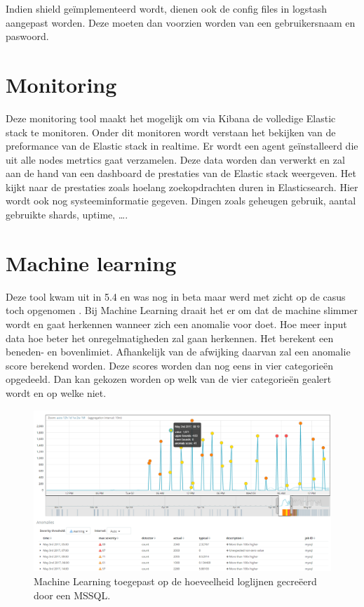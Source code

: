Indien shield geïmplementeerd wordt, dienen ook de config files in logstash aangepast worden. Deze moeten dan voorzien worden van een gebruikersnaam en paswoord.

\section{Monitoring}
\label{sec:monitoring}

Deze monitoring tool maakt het mogelijk om via Kibana de volledige Elastic stack te monitoren. Onder dit monitoren wordt verstaan het bekijken van de preformance van de Elastic stack in realtime.
Er wordt een agent geïnstalleerd die uit alle nodes metrtics gaat verzamelen.
Deze data worden dan verwerkt en zal aan de hand van een dashboard de prestaties van de Elastic stack weergeven. 
Het kijkt naar de prestaties zoals hoelang zoekopdrachten duren in Elasticsearch. Hier wordt ook nog systeeminformatie gegeven. Dingen zoals geheugen gebruik, aantal gebruikte shards, uptime, \dots \autocite{clusterstatus}.

\section{Machine learning}
\label{sec:machine-learning}

Deze tool kwam uit in 5.4 en was nog in beta maar werd met zicht op de casus toch opgenomen \autocite{machinelearningdemo}.
Bij Machine Learning draait het er om dat de machine slimmer wordt en gaat herkennen wanneer zich een anomalie voor doet. Hoe meer input data hoe beter het onregelmatigheden zal gaan herkennen.
Het berekent een beneden- en bovenlimiet. Afhankelijk van de afwijking daarvan zal een anomalie score berekend worden. Deze scores worden dan nog eens in vier categorieën opgedeeld. 
Dan kan gekozen worden op welk van de vier categorieën gealert wordt en op welke niet.
\begin{figure}[h]
	\includegraphics[width=16cm]{img/machinelearning1}
	\caption{Machine Learning toegepast op de hoeveelheid loglijnen gecreëerd door een MSSQL.}
	\label{fig:machinelearning1}
\end{figure}

